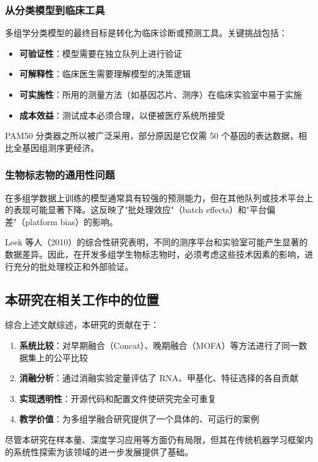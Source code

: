\subsubsection{从分类模型到临床工具}

多组学分类模型的最终目标是转化为临床诊断或预测工具。关键挑战包括：

\begin{itemize}
    \item \textbf{可验证性}：模型需要在独立队列上进行验证
    \item \textbf{可解释性}：临床医生需要理解模型的决策逻辑
    \item \textbf{可实施性}：所用的测量方法（如基因芯片、测序）在临床实验室中易于实施
    \item \textbf{成本效益}：测试成本必须合理，以便被医疗系统所接受
\end{itemize}

PAM50 分类器之所以被广泛采用，部分原因是它仅需 50 个基因的表达数据，相比全基因组测序更经济。

\subsubsection{生物标志物的通用性问题}

在多组学数据上训练的模型通常具有较强的预测能力，但在其他队列或技术平台上的表现可能显著下降。这反映了"批处理效应"（batch effects）和"平台偏差"（platform bias）的影响。

Leek 等人（2010）的综合性研究表明，不同的测序平台和实验室可能产生显著的数据差异。因此，在开发多组学生物标志物时，必须考虑这些技术因素的影响，进行充分的批处理校正和外部验证。

\subsection{本研究在相关工作中的位置}

综合上述文献综述，本研究的贡献在于：

\begin{enumerate}
    \item \textbf{系统比较}：对早期融合（Concat）、晚期融合（MOFA）等方法进行了同一数据集上的公平比较
    \item \textbf{消融分析}：通过消融实验定量评估了 RNA、甲基化、特征选择的各自贡献
    \item \textbf{实现透明性}：开源代码和配置文件使研究完全可重复
    \item \textbf{教学价值}：为多组学融合研究提供了一个具体的、可运行的案例
\end{enumerate}

尽管本研究在样本量、深度学习应用等方面仍有局限，但其在传统机器学习框架内的系统性探索为该领域的进一步发展提供了基础。
